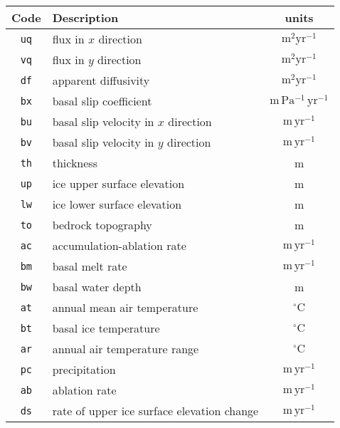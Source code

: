 \documentclass[11pt]{article}
\begin{document}
\begin{center}
\begin{tabular}{|c|l|c|}
\hline
Code & Description & units \\
\hline
\hline
\texttt{uq} & flux in $x$ direction & $\mathrm{m}^2\mathrm{yr}^{-1}$ \\
\texttt{vq} & flux in $y$ direction & $\mathrm{m}^2\mathrm{yr}^{-1}$ \\
\texttt{df} & apparent diffusivity & $\mathrm{m}^2\mathrm{yr}^{-1}$ \\
\texttt{bx} & basal slip coefficient & $\mathrm{m\,Pa^{-1}\,yr^{-1}}$ \\
\texttt{bu} & basal slip velocity in $x$ direction & $\mathrm{m\,yr^{-1}}$\\
\texttt{bv} & basal slip velocity in $y$ direction & $\mathrm{m\,yr^{-1}}$\\
\texttt{th} & thickness & m \\
\texttt{up} & ice upper surface elevation & m \\
\texttt{lw} & ice lower surface elevation & m \\
\texttt{to} & bedrock topography & m \\
\texttt{ac} & accumulation-ablation rate & $\mathrm{m\,yr^{-1}}$ \\
\texttt{bm} & basal melt rate & $\mathrm{m\,yr^{-1}}$ \\
\texttt{bw} & basal water depth & m \\
\texttt{at} & annual mean air temperature & $^{\circ}\mathrm{C}$ \\
\texttt{bt} & basal ice temperature & $^{\circ}\mathrm{C}$ \\
\texttt{ar} & annual air temperature range & $^{\circ}\mathrm{C}$ \\
\texttt{pc} & precipitation & $\mathrm{m\,yr^{-1}}$ \\
\texttt{ab} & ablation rate & $\mathrm{m\,yr^{-1}}$ \\
\texttt{ds} & rate of upper ice surface elevation change &
$\mathrm{m\,yr^{-1}}$ \\
\hline
\end{tabular}
\end{center}
%
\end{document}
